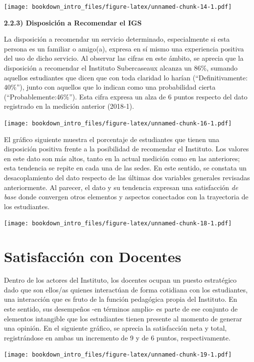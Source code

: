 \documentclass[]{book}
\begin{document}
\texttt{[image: bookdown\_intro\_files/figure-latex/unnamed-chunk-14-1.pdf]}

\textbf{2.2.3) Disposición a Recomendar el IGS}

La disposición a recomendar un servicio determinado, especialmente si
esta persona es un familiar o amigo(a), expresa en sí mismo una
experiencia positiva del uso de dicho servicio. Al observar las cifras
en este ámbito, se aprecia que la disposición a recomendar el Instituto
Subercaseaux alcanza un 86\%, sumando aquellos estudiantes que dicen que
con toda claridad lo harían (``Definitivamente: 40\%''), junto con
aquellos que lo indican como una probabilidad cierta
(``Probablemente:46\%''). Esta cifra expresa un alza de 6 puntos
respecto del dato registrado en la medición anterior (2018-1).

\texttt{[image: bookdown\_intro\_files/figure-latex/unnamed-chunk-16-1.pdf]}

El gráfico siguiente muestra el porcentaje de estudiantes que tienen una
disposición positiva frente a la posibilidad de recomendar el Instituto.
Los valores en este dato son más altos, tanto en la actual medición como
en las anteriores; esta tendencia se repite en cada una de las sedes. En
este sentido, se constata un desacoplamiento del dato respecto de las
últimas dos variables generales revisadas anteriormente. Al parecer, el
dato y su tendencia expresan una satisfacción \emph{de base} donde
convergen otros elementos y aspectos conectados con la trayectoria de
los estudiantes.

\texttt{[image: bookdown\_intro\_files/figure-latex/unnamed-chunk-18-1.pdf]}

\section{Satisfacción con Docentes}\label{satisfaccion-con-docentes}

Dentro de los actores del Instituto, los docentes ocupan un puesto
estratégico dado que son ellos/as quienes interactúan de forma cotidiana
con los estudiantes, una interacción que es fruto de la función
pedagógica propia del Instituto. En este sentido, sus desempeños -en
términos amplio- es parte de ese conjunto de elementos intangible que
los estudiantes tienen presente al momento de generar una opinión. En el
siguiente gráfico, se aprecia la satisfacción neta y total,
registrándose en ambas un incremento de 9 y de 6 puntos,
respectivamente.

\texttt{[image: bookdown\_intro\_files/figure-latex/unnamed-chunk-19-1.pdf]}
\end{document}
